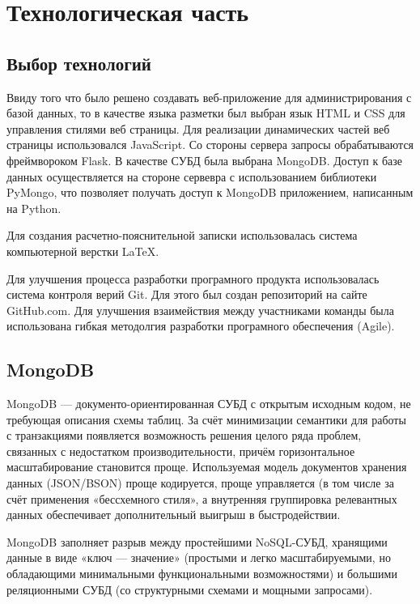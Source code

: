 \section{Технологическая часть}

\subsection{Выбор технологий}
Ввиду того что было решено создавать веб-приложение для администрирования с базой данных, то в качестве языка разметки был выбран язык HTML и CSS для управления стилями веб страницы. Для реализации динамических частей веб страницы использовался JavaScript. Со стороны сервера запросы обрабатываются фреймвороком Flask. В качестве СУБД была выбрана MongoDB. Доступ к базе данных осуществляется на стороне сервевра с использованием библиотеки PyMongo, что позволяет получать доступ к MongoDB приложением, написанным на Python.\par
Для создания расчетно-пояснительной записки использовалась система компьютерной верстки LaTeX.\par
Для улучшения процесса разработки програмного продукта использовалась система контроля верий Git. Для этого был создан репозиторий на сайте GitHub.com. Для улучшения взаимействия между участниками команды была использована гибкая методолгия разработки програмного обеспечения (Agile).

\subsection{MongoDB}
MongoDB — документо-ориентированная СУБД с открытым исходным кодом, не требующая описания схемы таблиц. За счёт минимизации семантики для работы с транзакциями появляется возможность решения целого ряда проблем, связанных с недостатком производительности, причём горизонтальное масштабирование становится проще. Используемая модель документов хранения данных (JSON/BSON) проще кодируется, проще управляется (в том числе за счёт применения «бессхемного стиля», а внутренняя группировка релевантных данных обеспечивает дополнительный выигрыш в быстродействии.\par
MongoDB заполняет разрыв между простейшими NoSQL-СУБД, хранящими данные в виде «ключ — значение» (простыми и легко масштабируемыми, но обладающими минимальными функциональными возможностями) и большими реляционными СУБД (со структурными схемами и мощными запросами).\par


